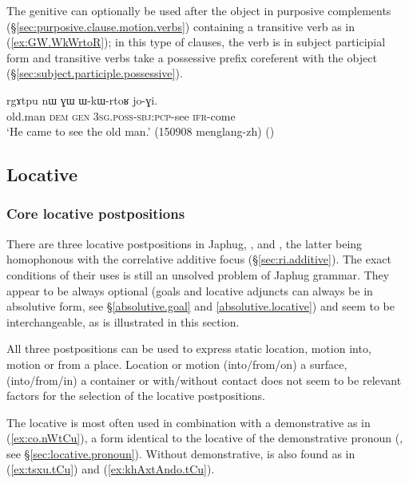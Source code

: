 The genitive  can optionally be used after the object in purposive complements (§\ref{sec:purposive.clause.motion.verbs}) containing a transitive verb as in (\ref{ex:GW.WkWrtoR}); in this type of clauses, the verb is in subject participial form and transitive verbs take a possessive prefix coreferent with the object (§\ref{sec:subject.participle.possessive}).

\begin{exe}
\ex \label{ex:GW.WkWrtoR}
\gll rgɤtpu nɯ ɣɯ ɯ-kɯ-rtoʁ jo-ɣi. \\
old.man \textsc{dem} \textsc{gen} \textsc{3sg}.\textsc{poss}-\textsc{sbj}:\textsc{pcp}-see \textsc{ifr}-come \\
\glt `He came to see the old man.' (150908 menglang-zh)
()
\end{exe}

\subsection{Locative} \label{sec:locative}
 

\subsubsection{Core locative postpositions} \label{sec:core.locative}
There are three locative postpositions in Japhug, ,  and , the latter being homophonous with the correlative additive focus  (§\ref{sec:ri.additive}). The exact conditions of their uses is still an unsolved problem of Japhug grammar. They appear to be always optional (goals and locative adjuncts can always be in absolutive form, see §\ref{absolutive.goal}  and \ref{absolutive.locative}) and seem to be interchangeable, as is illustrated in this section.

All three postpositions can be used to express static location, motion into, motion or from a place. Location or motion (into/from/on) a surface, (into/from/in) a container or with/without contact does not seem to be relevant factors for the selection of the locative postpositions.

The locative   is most often used in combination with a demonstrative  as in (\ref{ex:co.nWtCu}), a form identical to the locative of the demonstrative pronoun (, see §\ref{sec:locative.pronoun}). Without demonstrative,  is also found as in (\ref{ex:tsxu.tCu}) and (\ref{ex:khAxtAndo.tCu}).


